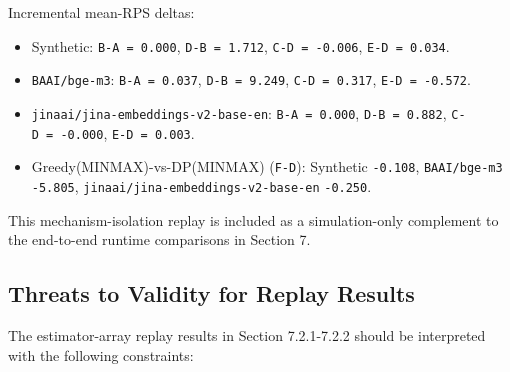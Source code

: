 \documentclass{article}
\providecommand{\tightlist}{\setlength{\itemsep}{0pt}\setlength{\parskip}{0pt}}
\begin{document}
\begin{table}[t]
\centering
{}
\end{table}

Incremental mean-RPS deltas:

\begin{itemize}
\tightlist
\item
  Synthetic: \texttt{B-A\ =\ 0.000}, \texttt{D-B\ =\ 1.712},
  \texttt{C-D\ =\ -0.006}, \texttt{E-D\ =\ 0.034}.
\item
  \texttt{BAAI/bge-m3}: \texttt{B-A\ =\ 0.037}, \texttt{D-B\ =\ 9.249},
  \texttt{C-D\ =\ 0.317}, \texttt{E-D\ =\ -0.572}.
\item
  \texttt{jinaai/jina-embeddings-v2-base-en}: \texttt{B-A\ =\ 0.000},
  \texttt{D-B\ =\ 0.882}, \texttt{C-D\ =\ -0.000},
  \texttt{E-D\ =\ 0.003}.
\item
  Greedy(MINMAX)-vs-DP(MINMAX) (\texttt{F-D}): Synthetic
  \texttt{-0.108}, \texttt{BAAI/bge-m3} \texttt{-5.805},
  \texttt{jinaai/jina-embeddings-v2-base-en} \texttt{-0.250}.
\end{itemize}

This mechanism-isolation replay is included as a simulation-only
complement to the end-to-end runtime comparisons in Section 7.

\hypertarget{723-threats-to-validity-for-replay-results}{%
\subsection{Threats to Validity for Replay
Results}\label{723-threats-to-validity-for-replay-results}}

The estimator-array replay results in Section 7.2.1-7.2.2 should be
interpreted with the following constraints:
\end{document}
